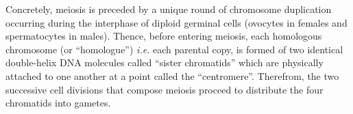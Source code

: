 




Concretely, meiosis is preceded by a unique round of chromosome duplication occurring during the interphase of diploid germinal cells (ovocytes in females and spermatocytes in males).
Thence, before entering meiosis, each homologous chromosome (or “homologue”) \textit{i.e.} each parental copy, is formed of two identical double-helix DNA molecules called “sister chromatids” which are physically attached to one another at a point called the “centromere”. 
Therefrom, the two successive cell divisions that compose meiosis proceed to distribute the four chromatids into gametes.

